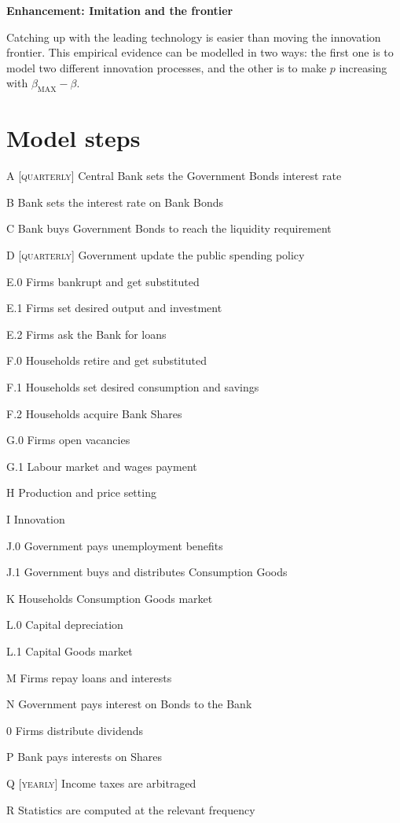 \documentclass[a4paper, headings=standardclasses]{scrartcl}
\newenvironment{enh}[1][]{\begin{framed}\noindent\textbf{Enhancement: #1}\par}{\end{framed}}
\begin{document}
\begin{enh}[Imitation and the frontier]
	Catching up with the leading technology is easier than moving the innovation frontier. This empirical evidence can be modelled in two ways: the first one is to model two different innovation processes, and the other is to make $p$ increasing with $\beta_\text{MAX} - \beta$.
\end{enh}

\section{Model steps}
\begin{steps}
	\item[A] [\textsc{quarterly}] Central Bank sets the Government Bonds interest rate
	\item[B] Bank sets the interest rate on Bank Bonds
	\item[C] Bank buys Government Bonds to reach the liquidity requirement
	\item[D] [\textsc{quarterly}] Government update the public spending policy
	\item[E.0] Firms bankrupt and get substituted
	\item[E.1] Firms set desired output and investment
	\item[E.2] Firms ask the Bank for loans
	\item[F.0] Households retire and get substituted
	\item[F.1] Households set desired consumption and savings
	\item[F.2] Households acquire Bank Shares
	\item[G.0] Firms open vacancies
	\item[G.1] Labour market and wages payment
	\item[H] Production and price setting
	\item[I] Innovation
	\item[J.0] Government pays unemployment benefits
	\item[J.1] Government buys and distributes Consumption Goods
	\item[K] Households Consumption Goods market
	\item[L.0] Capital depreciation
	\item[L.1] Capital Goods market
	\item[M] Firms repay loans and interests
	\item[N] Government pays interest on Bonds to the Bank
	\item[0] Firms distribute dividends
	\item[P] Bank pays interests on Shares
	\item[Q] [\textsc{yearly}] Income taxes are arbitraged
	\item[R] Statistics are computed at the relevant frequency
\end{steps}
\end{document}
